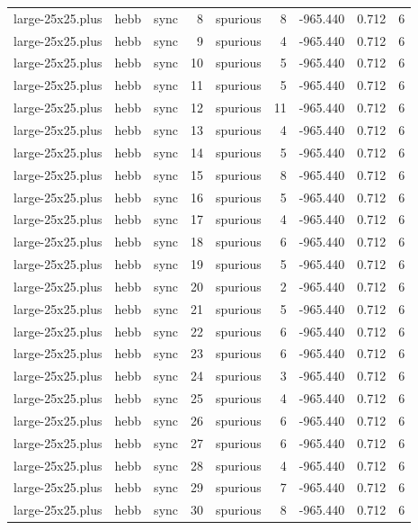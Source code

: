 \begin{tabular}{lllrlrrrr}
large-25x25.plus & hebb & sync & 8 & spurious & 8 & -965.440 & 0.712 & 6 \\
large-25x25.plus & hebb & sync & 9 & spurious & 4 & -965.440 & 0.712 & 6 \\
large-25x25.plus & hebb & sync & 10 & spurious & 5 & -965.440 & 0.712 & 6 \\
large-25x25.plus & hebb & sync & 11 & spurious & 5 & -965.440 & 0.712 & 6 \\
large-25x25.plus & hebb & sync & 12 & spurious & 11 & -965.440 & 0.712 & 6 \\
large-25x25.plus & hebb & sync & 13 & spurious & 4 & -965.440 & 0.712 & 6 \\
large-25x25.plus & hebb & sync & 14 & spurious & 5 & -965.440 & 0.712 & 6 \\
large-25x25.plus & hebb & sync & 15 & spurious & 8 & -965.440 & 0.712 & 6 \\
large-25x25.plus & hebb & sync & 16 & spurious & 5 & -965.440 & 0.712 & 6 \\
large-25x25.plus & hebb & sync & 17 & spurious & 4 & -965.440 & 0.712 & 6 \\
large-25x25.plus & hebb & sync & 18 & spurious & 6 & -965.440 & 0.712 & 6 \\
large-25x25.plus & hebb & sync & 19 & spurious & 5 & -965.440 & 0.712 & 6 \\
large-25x25.plus & hebb & sync & 20 & spurious & 2 & -965.440 & 0.712 & 6 \\
large-25x25.plus & hebb & sync & 21 & spurious & 5 & -965.440 & 0.712 & 6 \\
large-25x25.plus & hebb & sync & 22 & spurious & 6 & -965.440 & 0.712 & 6 \\
large-25x25.plus & hebb & sync & 23 & spurious & 6 & -965.440 & 0.712 & 6 \\
large-25x25.plus & hebb & sync & 24 & spurious & 3 & -965.440 & 0.712 & 6 \\
large-25x25.plus & hebb & sync & 25 & spurious & 4 & -965.440 & 0.712 & 6 \\
large-25x25.plus & hebb & sync & 26 & spurious & 6 & -965.440 & 0.712 & 6 \\
large-25x25.plus & hebb & sync & 27 & spurious & 6 & -965.440 & 0.712 & 6 \\
large-25x25.plus & hebb & sync & 28 & spurious & 4 & -965.440 & 0.712 & 6 \\
large-25x25.plus & hebb & sync & 29 & spurious & 7 & -965.440 & 0.712 & 6 \\
large-25x25.plus & hebb & sync & 30 & spurious & 8 & -965.440 & 0.712 & 6 \\

\end{tabular}
